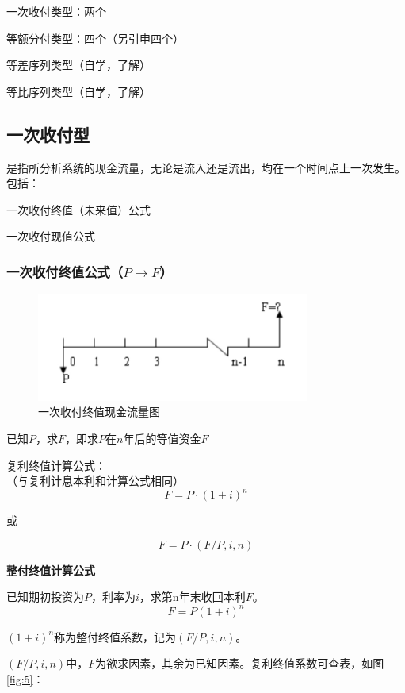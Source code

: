 \documentclass[12pt, a4paper, oneside]{ctexbook}
\begin{document}
一次收付类型：两个

等额分付类型：四个（另引申四个）

等差序列类型（自学，了解）

等比序列类型（自学，了解）

\subsection{一次收付型}
是指所分析系统的现金流量，无论是流入还是流出，均在一个时间点上一次发生。包括：

一次收付终值（未来值）公式

一次收付现值公式

\subsubsection{一次收付终值公式（$P \to F$）}

\begin{figure}[H]
    \centering
    \includegraphics[width=0.8\textwidth]{image/一次收付终值现金流量图.png}
    \caption{一次收付终值现金流量图}
    \label{fig:3}
\end{figure}

已知$P$，求$F$，即求$P$在$n$年后的等值资金$F$

复利终值计算公式：\\
（与复利计息本利和计算公式相同）
$$F=P \cdot (1+i)^n$$

或

$$F=P \cdot (F/P,i,n)$$



\textbf{整付终值计算公式}

已知期初投资为$P$，利率为$i$，求第n年末收回本利$F$。
$$F=P(1+i)^n$$

$(1+i)^n$称为整付终值系数，记为$(F/P,i,n)$。

$(F/P,i,n)$中，$F$为欲求因素，其余为已知因素。复利终值系数可查表，如图\ref{fig:5}：
\end{document}
